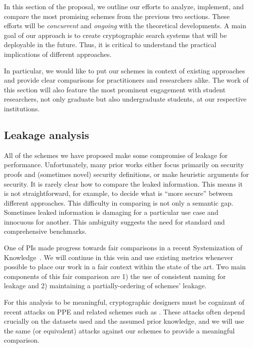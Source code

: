 
In this section of the proposal, we outline our efforts to analyze,
implement, and compare the most promising schemes from the previous two
sections. These efforts will be \emph{concurrent} and \emph{ongoing}
with the theoretical developments. A main goal of our approach is to create cryptographic search systems that will be deployable in the future.  Thus, it is critical to understand
the practical implications of different approaches.

In particular, we would like to put our schemes in
context of existing approaches and provide clear comparisons for
practitioners and researchers alike.
The work of this section will also feature the most prominent engagement with
student researchers, not only graduate but also undergraduate students, at our
respective institutions.

\subsection{Leakage analysis}

All of the schemes we have proposed make some compromise of leakage for
performance. Unfortunately, many prior works either focus primarily on security
proofs and (sometimes novel) security definitions, or make heuristic
arguments for security. It is rarely clear how to compare the leaked information.  This means it is not
straightforward, for example, to decide what is ``more secure'' between
different approaches.  This difficulty in comparing is not only a semantic gap. Sometimes leaked information is damaging for a particular use case and innocuous for another.  This ambiguity suggests the need for standard and comprehensive benchmarks.

One of PIs made progress towards fair comparisons in a recent
Systemization of Knowledge~\cite{SP:FVYSHG17}. We will continue in this vein and use existing
metrics whenever possible to place our work in a fair context within the
state of the art.  Two main components of this fair comparison are 1) the use of  consistent naming for leakage and 2) maintaining a partially-ordering of schemes' leakage.

For this analysis to be meaningful, cryptographic designers must be cognizant of
recent attacks on PPE and related schemes such as
\cite{CCS:CGPR15,CCS:KKNO16}. These attacks often depend crucially on
the datasets used and the assumed prior knowledge, and we will use the same (or equivalent) attacks
against our schemes to provide a meaningful comparison.

